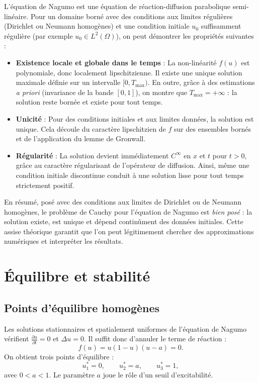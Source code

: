 \documentclass[11pt,a4paper]{report}
\begin{document}
L’équation de Nagumo est une équation de réaction-diffusion parabolique semi-linéaire. Pour un domaine borné avec des conditions aux limites régulières (Dirichlet ou Neumann homogènes) et une condition initiale $u_0$ suffisamment régulière (par exemple $u_0 \in L^2(\Omega)$), on peut démontrer les propriétés suivantes :

\begin{itemize}
  \item \textbf{Existence locale et globale dans le temps} : La non-linéarité $f(u)$ est polynomiale, donc localement lipschitzienne. Il existe une unique solution maximale définie sur un intervalle $[0,T_{\max})$. En outre, gr\^ace à des estimations \textit{a priori} (invariance de la bande $[0,1]$), on montre que $T_{\max} = +\infty$ : la solution reste bornée et existe pour tout temps.
  
  \item \textbf{Unicité} : Pour des conditions initiales et aux limites données, la solution est unique. Cela découle du caractère lipschitzien de $f$ sur des ensembles bornés et de l’application du lemme de Gronwall.
  
  \item \textbf{Régularité} : La solution devient immédiatement $C^\infty$ en $x$ et $t$ pour $t>0$, grâce au caractère régularisant de l’opérateur de diffusion. Ainsi, même une condition initiale discontinue conduit à une solution lisse pour tout temps strictement positif.
\end{itemize}

En résumé, posé avec des conditions aux limites de Dirichlet ou de Neumann homogènes, le problème de Cauchy pour l’équation de Nagumo est \textit{bien posé} : la solution existe, est unique et dépend continûment des données initiales. Cette assise théorique garantit que l’on peut légitimement chercher des approximations numériques et interpréter les résultats.

\section{Équilibre et stabilité}

\subsection*{Points d’équilibre homogènes}

Les solutions stationnaires et spatialement uniformes de l’équation de Nagumo vérifient $\frac{\partial u}{\partial t}=0$ et $\Delta u = 0$. Il suffit donc d’annuler le terme de réaction :
\[
f(u)=u(1-u)(u-a)=0.
\]
On obtient trois points d’équilibre :
\[
u^*_1 = 0,\qquad u^*_2 = a,\qquad u^*_3 = 1,
\]
avec $0<a<1$. Le paramètre $a$ joue le rôle d’un seuil d’excitabilité.
\end{document}
